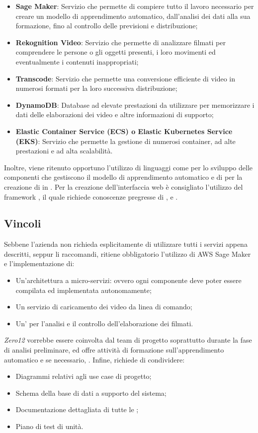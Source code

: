 \begin{itemize}
\item \textbf{Sage Maker}: Servizio che permette di compiere tutto il lavoro necessario per creare un modello di apprendimento automatico, dall'analisi dei dati alla sua formazione, fino al controllo delle previsioni e distribuzione;
\item \textbf{Rekognition Video}: Servizio che permette di analizzare filmati per comprendere le persone o gli oggetti presenti, i loro movimenti ed eventualmente i contenuti inappropriati;
\item \textbf{Transcode}: Servizio che permette una conversione efficiente di video in numerosi formati per la loro successiva distribuzione;
\item \textbf{DynamoDB}: Database  ad elevate prestazioni da utilizzare per memorizzare i dati delle elaborazioni dei video e altre informazioni di supporto;
\item \textbf{Elastic Container Service (ECS) o Elastic Kubernetes Service (EKS)}: Servizio che permette la gestione di numerosi container, ad alte prestazioni e ad alta scalabilità.
\end{itemize}
Inoltre, viene ritenuto opportuno l'utilizzo di linguaggi come  per lo sviluppo delle componenti che gestiscono il modello di apprendimento automatico e di  per la creazione di   in . Per la creazione dell'interfaccia web \`e consigliato l'utilizzo del framework , il quale richiede conoscenze pregresse di ,  e .

\subsection{Vincoli}
Sebbene l'azienda non richieda esplicitamente di utilizzare tutti i servizi appena descritti, seppur li raccomandi, ritiene obbligatorio l'utilizzo di AWS Sage Maker e l'implementazione di:

\begin{itemize}
\item Un'architettura a micro-servizi: ovvero ogni componente deve poter essere compilata ed implementata autonomamente;
\item Un servizio di caricamento dei video da linea di comando;
\item Un' per l'analisi e il controllo dell'elaborazione dei filmati.
\end{itemize}
\textit{Zero12} vorrebbe essere coinvolta dal team di progetto soprattutto durante la fase di analisi preliminare, ed offre attività di formazione sull'apprendimento automatico e se necessario,  .
Infine, richiede di condividere:
\begin{itemize}
\item Diagrammi  relativi agli use case di progetto;
\item Schema della base di dati a supporto del sistema;
\item Documentazione dettagliata di tutte le ;
\item Piano di test di unità.
\end{itemize}

